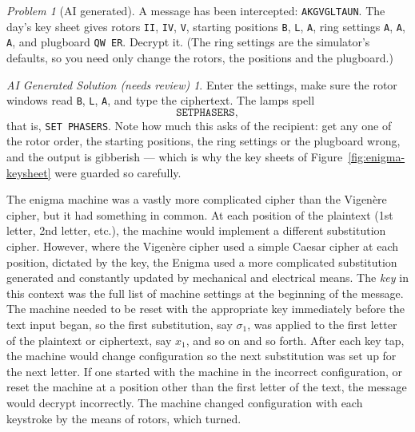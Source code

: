 \documentclass{article}
\theoremstyle{plain}
\theoremstyle{definition}
\theoremstyle{remark}
\newtheorem{problem}[theorem]{Problem}
\newtheorem*{aisolution}{AI Generated Solution (needs review)}
\numberwithin{theorem}{section}
\begin{document}
{\begin{problem}[AI generated]
A message has been intercepted:  \texttt{AKGVGLTAUN}.  The day's key sheet gives rotors \texttt{II}, \texttt{IV}, \texttt{V}, starting positions \texttt{B}, \texttt{L}, \texttt{A}, ring settings \texttt{A}, \texttt{A}, \texttt{A}, and plugboard \texttt{QW ER}.  Decrypt it.  (The ring settings are the simulator's defaults, so you need only change the rotors, the positions and the plugboard.)
\end{problem}
\begin{aisolution}
Enter the settings, make sure the rotor windows read \texttt{B}, \texttt{L}, \texttt{A}, and type the ciphertext.  The lamps spell
\[
	\texttt{SETPHASERS},
\]
that is, \texttt{SET PHASERS}.  Note how much this asks of the recipient:  get any one of the rotor order, the starting positions, the ring settings or the plugboard wrong, and the output is gibberish --- which is why the key sheets of Figure~\ref{fig:enigma-keysheet} were guarded so carefully.
\end{aisolution}
}

The enigma machine was a vastly more complicated cipher than the Vigen\`ere cipher, but it had something in common.  At each position of the plaintext (1st letter, 2nd letter, etc.), the machine would implement a different substitution cipher.  However, where the Vigen\`ere cipher used a simple Caesar cipher at each position, dictated by the key, the Enigma used a more complicated substitution generated and constantly updated by mechanical and electrical means.  The \emph{key} in this context was the full list of machine settings at the beginning of the message.  The machine needed to be reset with the appropriate key immediately before the text input began, so the first substitution, say $\sigma_1$, was applied to the first letter of the plaintext or ciphertext, say $x_1$, and so on and so forth.  After each key tap, the machine would change configuration so the next substitution was set up for the next letter.  If one started with the machine in the incorrect configuration, or reset the machine at a position other than the first letter of the text, the message would decrypt incorrectly.  The machine changed configuration with each keystroke by the means of rotors, which turned.
\end{document}
